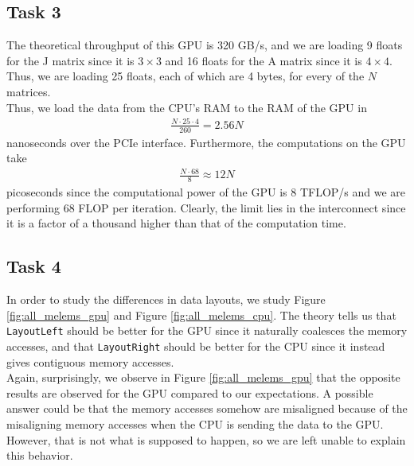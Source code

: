 \documentclass[10pt]{article}
\begin{document}
\subsection{Task 3}
The theoretical throughput of this GPU is 320 GB/s, and we are loading 9 floats for the J matrix since it is $3\times3$ and 16 floats for the A matrix since it is $4\times4$. Thus, we are loading 25 floats, each of which are 4 bytes, for every of the $N$ matrices. \\

Thus, we load the data from the CPU's RAM to the RAM of the GPU in
\begin{align*}
    \frac{N\cdot25\cdot4}{260}=2.56N
\end{align*}
nanoseconds over the PCIe interface. Furthermore, the computations on the GPU take
\begin{align*}
    \frac{N\cdot68}{8}\approx 12N
\end{align*}
picoseconds since the computational power of the GPU is 8 TFLOP/s and we are performing 68 FLOP per iteration. Clearly, the limit lies in the interconnect since it is a factor of a thousand higher than that of the computation time.
\subsection{Task 4}
In order to study the differences in data layouts, we study Figure \ref{fig:all_melems_gpu} and Figure \ref{fig:all_melems_cpu}. The theory tells us that \texttt{LayoutLeft} should be better for the GPU since it naturally coalesces the memory accesses, and that \texttt{LayoutRight} should be better for the CPU since it instead gives contiguous memory accesses. \\

Again, surprisingly, we observe in Figure \ref{fig:all_melems_gpu} that the opposite results are observed for the GPU compared to our expectations. A possible answer could be that the memory accesses somehow are misaligned because of the misaligning memory accesses when the CPU is sending the data to the GPU. However, that is not what is supposed to happen, so we are left unable to explain this behavior. \\
\end{document}
